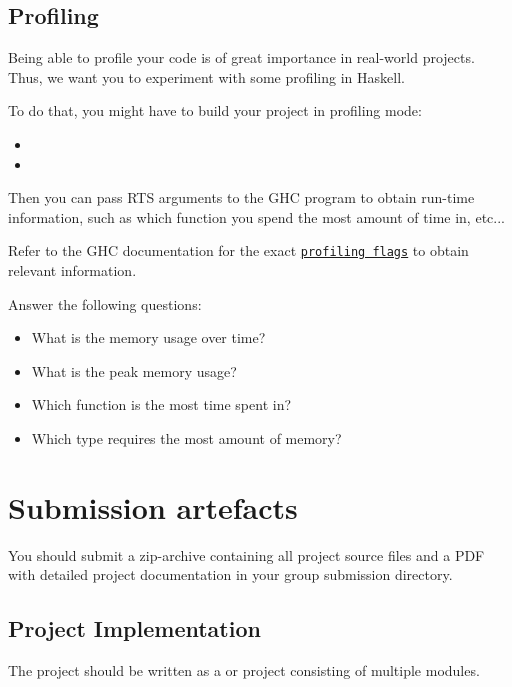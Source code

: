 \documentclass{article}
\begin{document}
\subsection{Profiling}

Being able to profile your code is of great importance in real-world projects. Thus, we want you to experiment with some profiling in Haskell.

To do that, you might have to build your project in profiling mode:

\begin{itemize}
\item {}
\item {}
\end{itemize}

Then you can pass RTS arguments to the GHC program to obtain run-time information, such as which function you spend the most amount of time in, etc...

Refer to the GHC documentation for the exact \href{https://downloads.haskell.org/ghc/latest/docs/html/users_guide/profiling.html#profiling-memory-usage}{\texttt{profiling flags}} to obtain relevant information.

Answer the following questions:

\begin{itemize}
\item What is the memory usage over time?
\item What is the peak memory usage?
\item Which function is the most time spent in?
\item Which type requires the most amount of memory?
\end{itemize}

\section{Submission artefacts}

You should submit a zip-archive containing all project source files and a PDF with detailed project documentation in your group submission directory.

\subsection{Project Implementation}

The project should be written as a  or  project consisting of multiple modules.
\end{document}
